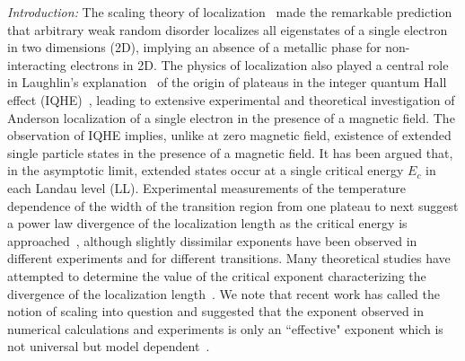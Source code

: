 \documentclass[twocolumn,floatfix,prb,aps,showpacs]{revtex4-2}
\begin{document}
{\it Introduction:}
The scaling theory of localization~\cite{Abrahams79} made the remarkable prediction that arbitrary weak random disorder localizes all eigenstates of a single electron in two dimensions (2D), implying an absence of a metallic phase for non-interacting electrons in 2D.  The physics of localization also played a central role in Laughlin's explanation~\cite{Laughlin81} of the origin of plateaus in the integer quantum Hall effect (IQHE)~\cite{Klitzing80}, leading to extensive experimental and theoretical investigation of Anderson localization of a single electron in the presence of a magnetic field.
The observation of IQHE implies, unlike at zero magnetic field, existence of extended single particle states in the presence of a magnetic field. It has been argued that, in the asymptotic limit, extended states occur at a single critical energy $E_c$ in each Landau level (LL). Experimental measurements of the temperature dependence of the width of the transition region from one plateau to next suggest a power law divergence of the localization length as the critical energy is approached~\cite{Li05,Li09}, although slightly dissimilar exponents have been observed in different experiments and for different transitions. Many theoretical studies have attempted to determine the value of the critical exponent characterizing the divergence of the localization length~\cite{DasSarma96,Huckestein95,Chalker88,Arovas88,Zirnbauer94,Bhatt21,Zhu21b}. We note that recent work has called the notion of scaling into question and suggested that the exponent observed in numerical calculations and experiments is only an 
``effective" exponent which is not universal but model dependent~\cite{Zirnbauer19,Dresselhaus21}. 
\end{document}
